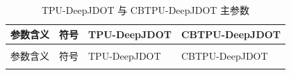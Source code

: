 \documentclass{seuthesis-2022}
\begin{document}
{
\setlength{\tabcolsep}{3.5pt}
\renewcommand{\arraystretch}{1.16}
\begin{longtable}{@{}>{\raggedright\arraybackslash}p{}>{\raggedright\arraybackslash}p{}>{\raggedright\arraybackslash}p{}>{\raggedright\arraybackslash}p{}@{}}
    \caption{TPU-DeepJDOT 与 CBTPU-DeepJDOT 主参数}
    \label{tab:seed42_single_method_params}\\
    \toprule
    参数含义 & 符号 & TPU-DeepJDOT & CBTPU-DeepJDOT \\
    \midrule
    \endfirsthead
    \multicolumn{4}{r}{续表~\thetable}\\
    \toprule
    参数含义 & 符号 & TPU-DeepJDOT & CBTPU-DeepJDOT \\
    \midrule
    \endhead
    \bottomrule
    \endfoot
    \bottomrule
    \endlastfoot


\end{longtable}}
\end{document}
